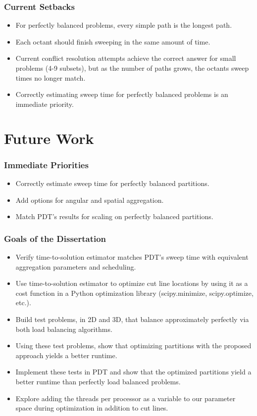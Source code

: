 \documentclass[xcolor={usenames,dvipsnames,svgnames,table}]{beamer}
\begin{document}
\begin{frame}[t]\frametitle{Current Setbacks}
\begin{block}{}
\begin{itemize}
	\item For perfectly balanced problems, every simple path is the longest path.
	\item Each octant should finish sweeping in the same amount of time.
	\item Current conflict resolution attempts achieve the correct answer for small problems (4-9 subsets), but as the number of paths grows, the octants sweep times no longer match.
	\item Correctly estimating sweep time for perfectly balanced problems is an immediate priority.
\end{itemize}
\end{block}
\end{frame}

\section{Future Work}

\begin{frame}[t]\frametitle{Immediate Priorities}
\begin{block}{}
\begin{itemize}
	\item Correctly estimate sweep time for perfectly balanced partitions.
	\item Add options for angular and spatial aggregation.
	\item Match PDT's results for scaling on perfectly balanced partitions.
\end{itemize}
\end{block}
\end{frame}

\begin{frame}[t]\frametitle{Goals of the Dissertation}
\begin{block}{}
\begin{itemize}
	\item Verify time-to-solution estimator matches PDT's sweep time with equivalent aggregation parameters and scheduling.
	\item Use time-to-solution estimator to optimize cut line locations by using it as a cost function in a Python optimization library (scipy.minimize, scipy.optimize, etc.). 
	\item Build test problems, in 2D and 3D, that balance approximately perfectly via both load balancing algorithms.
	\item Using these test problems, show that optimizing partitions with the proposed approach yields a better runtime.
	\item Implement these tests in PDT and show that the optimized partitions yield a better runtime than perfectly load balanced problems.
	\item Explore adding the threads per processor as a variable to our parameter space during optimization in addition to cut lines.
\end{itemize}
\end{block}
\end{frame}
\end{document}
